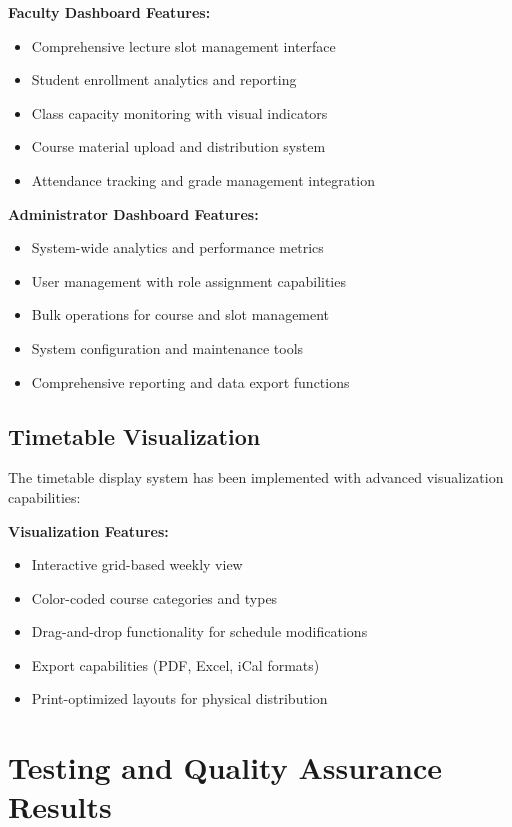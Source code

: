 \textbf{Faculty Dashboard Features:}
\begin{itemize}[leftmargin=*]
    \item Comprehensive lecture slot management interface
    \item Student enrollment analytics and reporting
    \item Class capacity monitoring with visual indicators
    \item Course material upload and distribution system
    \item Attendance tracking and grade management integration
\end{itemize}

\textbf{Administrator Dashboard Features:}
\begin{itemize}[leftmargin=*]
    \item System-wide analytics and performance metrics
    \item User management with role assignment capabilities
    \item Bulk operations for course and slot management
    \item System configuration and maintenance tools
    \item Comprehensive reporting and data export functions
\end{itemize}

\subsection{Timetable Visualization}

The timetable display system has been implemented with advanced visualization capabilities:

\textbf{Visualization Features:}
\begin{itemize}[leftmargin=*]
    \item Interactive grid-based weekly view
    \item Color-coded course categories and types
    \item Drag-and-drop functionality for schedule modifications
    \item Export capabilities (PDF, Excel, iCal formats)
    \item Print-optimized layouts for physical distribution
\end{itemize}

\section{Testing and Quality Assurance Results}

